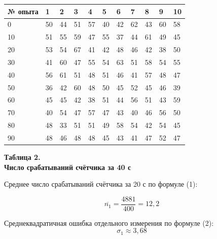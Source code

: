 



\begin{table}[H]
\centering
\begin{tabular}{|l|l|l|l|l|l|l|l|l|l|l|}
\hline
№ опыта & 1  & 2  & 3  & 4  & 5  & 6  & 7  & 8  & 9  & 10 \\ \hline
0       & 50 & 44 & 51 & 57 & 40 & 42 & 62 & 43 & 60 & 58 \\ \hline
10      & 51 & 55 & 59 & 47 & 55 & 37 & 44 & 61 & 49 & 45 \\ \hline
20      & 53 & 54 & 67 & 41 & 42 & 48 & 46 & 42 & 38 & 50 \\ \hline
30      & 41 & 60 & 47 & 55 & 54 & 63 & 51 & 58 & 54 & 55 \\ \hline
40      & 56 & 61 & 51 & 48 & 51 & 46 & 41 & 57 & 48 & 47 \\ \hline
50      & 36 & 42 & 60 & 48 & 50 & 45 & 52 & 45 & 46 & 39 \\ \hline
60      & 45 & 45 & 42 & 38 & 51 & 44 & 56 & 51 & 43 & 59 \\ \hline
70      & 40 & 54 & 47 & 57 & 47 & 43 & 40 & 46 & 56 & 50 \\ \hline
80      & 48 & 33 & 51 & 51 & 49 & 58 & 54 & 42 & 54 & 45 \\ \hline
90      & 48 & 46 & 48 & 48 & 45 & 43 & 41 & 47 & 52 & 47 \\ \hline
\end{tabular}
\begin{flushright}
{\scriptsize \textbf{Таблица 2.}\\ \textbf {Число срабатываний счётчика за 40 с}}
\end{flushright} 
\end{table}




Среднее число срабатываний счётчика за 20 с по формуле (1):


\[\overline{n_1} = \frac{4881}{400} = 12,2\]


Среднеквадратичная ошибка отдельного измерения по формуле (2):
\[\sigma_1 \approx 3,68\]


